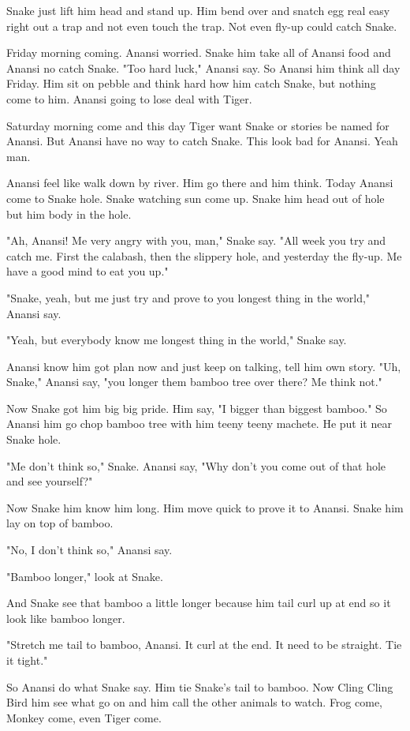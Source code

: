 Snake just lift him head and stand up. Him bend over and snatch egg real easy right out a trap and not even touch the trap. Not even fly-up could catch Snake.

Friday morning coming. Anansi worried. Snake him take all of Anansi food and Anansi no catch Snake. "Too hard luck," Anansi say. So Anansi him think all day Friday. Him sit on pebble and think hard how him catch Snake, but nothing come to him. Anansi going to lose deal with Tiger.

Saturday morning come and this day Tiger want Snake or stories be named for Anansi. But Anansi have no way to catch Snake. This look bad for Anansi. Yeah man.

Anansi feel like walk down by river. Him go there and him think. Today Anansi come to Snake hole. Snake watching sun come up. Snake him head out of hole but him body in the hole.

"Ah, Anansi! Me very angry with you, man," Snake say. "All week you try and catch me. First the calabash, then the slippery hole, and yesterday the fly-up. Me have a good mind to eat you up."

"Snake, yeah, but me just try and prove to you longest thing in the world," Anansi say.

"Yeah, but everybody know me longest thing in the world," Snake say.

Anansi know him got plan now and just keep on talking, tell him own story. "Uh, Snake," Anansi say, "you longer them bamboo tree over there? Me think not."

Now Snake got him big big pride. Him say, "I bigger than biggest bamboo." So Anansi him go chop bamboo tree with him teeny teeny machete. He put it near Snake hole.

"Me don't think so," Snake. Anansi say, "Why don't you come out of that hole and see yourself?"

Now Snake him know him long. Him move quick to prove it to Anansi. Snake him lay on top of bamboo.

"No, I don't think so," Anansi say.

"Bamboo longer," look at Snake.

And Snake see that bamboo a little longer because him tail curl up at end so it look like bamboo longer.

"Stretch me tail to bamboo, Anansi. It curl at the end. It need to be straight. Tie it tight."

So Anansi do what Snake say. Him tie Snake's tail to bamboo. Now Cling Cling Bird him see what go on and him call the other animals to watch. Frog come, Monkey come, even Tiger come.

